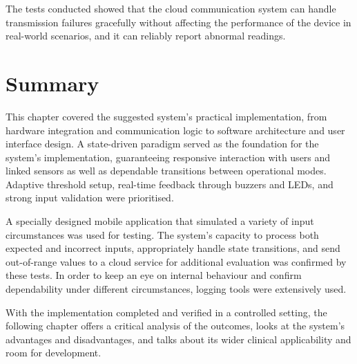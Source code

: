 The tests conducted showed that the cloud communication system can handle transmission failures gracefully without affecting the performance of the device in real-world scenarios, and it can reliably report abnormal readings.

\section{Summary}
This chapter covered the suggested system's practical implementation, from hardware integration and communication logic to software architecture and user interface design. A state-driven paradigm served as the foundation for the system's implementation, guaranteeing responsive interaction with users and linked sensors as well as dependable transitions between operational modes. Adaptive threshold setup, real-time feedback through buzzers and LEDs, and strong input validation were prioritised.

A specially designed mobile application that simulated a variety of input circumstances was used for testing. The system's capacity to process both expected and incorrect inputs, appropriately handle state transitions, and send out-of-range values to a cloud service for additional evaluation was confirmed by these tests. In order to keep an eye on internal behaviour and confirm dependability under different circumstances, logging tools were extensively used.

With the implementation completed and verified in a controlled setting, the following chapter offers a critical analysis of the outcomes, looks at the system's advantages and disadvantages, and talks about its wider clinical applicability and room for development.
